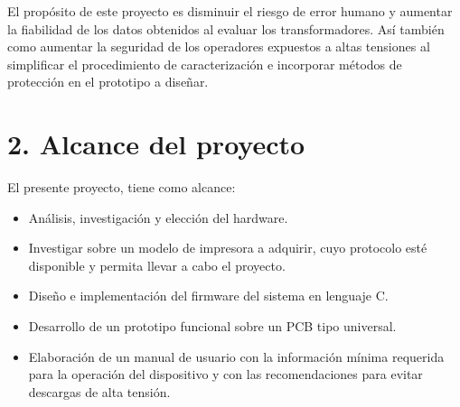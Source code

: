 \documentclass[11pt]{charter}
\begin{document}
El propósito de este proyecto es disminuir el riesgo de error humano y aumentar la fiabilidad de los datos obtenidos al evaluar los transformadores. Así también como aumentar la seguridad de los operadores expuestos a altas tensiones al simplificar el procedimiento de caracterización e incorporar métodos de protección en el prototipo a diseñar.


\section{2. Alcance del proyecto}
\label{sec:alcance}

El presente proyecto, tiene como alcance:
\begin{itemize}
\item Análisis, investigación y elección del hardware.
\item Investigar sobre un modelo de impresora a adquirir, cuyo protocolo esté disponible y permita llevar a cabo el proyecto.
\item Diseño e implementación del firmware del sistema en lenguaje C.
\item Desarrollo de un prototipo funcional sobre un PCB tipo universal.
\item Elaboración de un manual de usuario con la información mínima requerida para la operación del dispositivo y con las recomendaciones para evitar descargas de alta tensión. 
\end{itemize}
\end{document}
